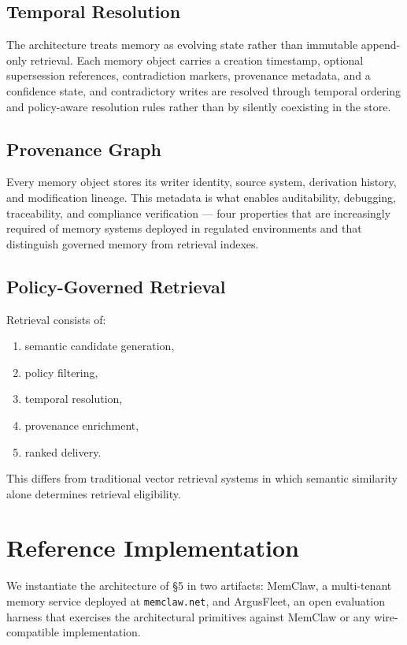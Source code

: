 \documentclass[10pt,twocolumn,letterpaper]{article}
\begin{document}
\subsection{Temporal Resolution}

The architecture treats memory as evolving state rather than immutable append-only retrieval. Each memory object carries a creation timestamp, optional supersession references, contradiction markers, provenance metadata, and a confidence state, and contradictory writes are resolved through temporal ordering and policy-aware resolution rules rather than by silently coexisting in the store.

\subsection{Provenance Graph}

Every memory object stores its writer identity, source system, derivation history, and modification lineage. This metadata is what enables auditability, debugging, traceability, and compliance verification --- four properties that are increasingly required of memory systems deployed in regulated environments and that distinguish governed memory from retrieval indexes.

\subsection{Policy-Governed Retrieval}

Retrieval consists of:
\begin{enumerate}
    \item semantic candidate generation,
    \item policy filtering,
    \item temporal resolution,
    \item provenance enrichment,
    \item ranked delivery.
\end{enumerate}

This differs from traditional vector retrieval systems in which semantic similarity alone determines retrieval eligibility.

\section{Reference Implementation}
\label{sec:impl}

We instantiate the architecture of \S5 in two artifacts: MemClaw, a multi-tenant memory service deployed at \texttt{memclaw.net}, and ArgusFleet, an open evaluation harness that exercises the architectural primitives against MemClaw or any wire-compatible implementation.
\end{document}
